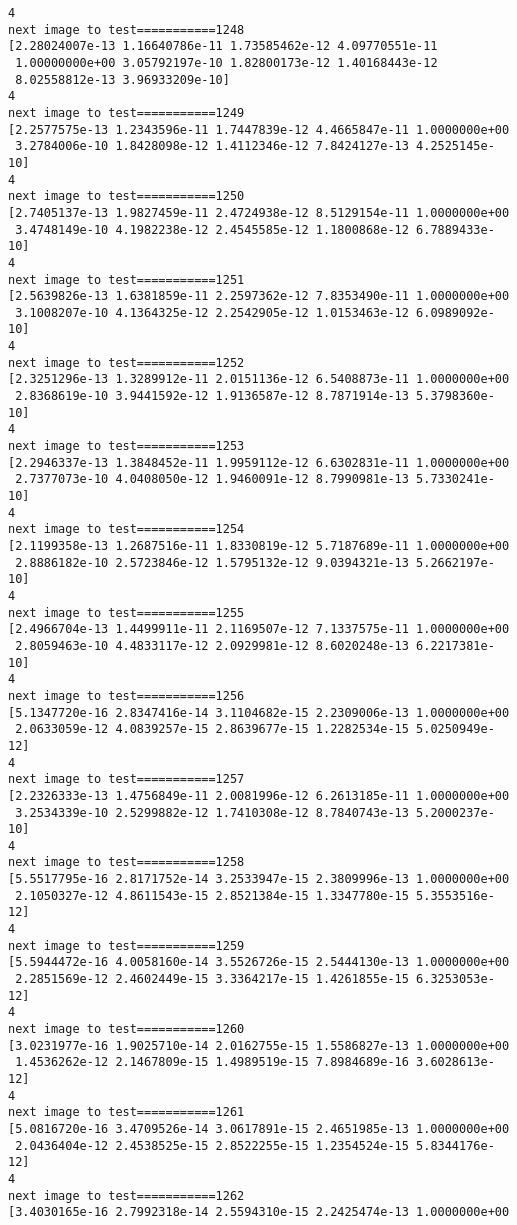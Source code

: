 \documentclass[11pt]{article}
\begin{document}
\begin{Verbatim}[commandchars=\\\{\}]
4
next image to test===========1248
[2.28024007e-13 1.16640786e-11 1.73585462e-12 4.09770551e-11
 1.00000000e+00 3.05792197e-10 1.82800173e-12 1.40168443e-12
 8.02558812e-13 3.96933209e-10]
4
next image to test===========1249
[2.2577575e-13 1.2343596e-11 1.7447839e-12 4.4665847e-11 1.0000000e+00
 3.2784006e-10 1.8428098e-12 1.4112346e-12 7.8424127e-13 4.2525145e-10]
4
next image to test===========1250
[2.7405137e-13 1.9827459e-11 2.4724938e-12 8.5129154e-11 1.0000000e+00
 3.4748149e-10 4.1982238e-12 2.4545585e-12 1.1800868e-12 6.7889433e-10]
4
next image to test===========1251
[2.5639826e-13 1.6381859e-11 2.2597362e-12 7.8353490e-11 1.0000000e+00
 3.1008207e-10 4.1364325e-12 2.2542905e-12 1.0153463e-12 6.0989092e-10]
4
next image to test===========1252
[2.3251296e-13 1.3289912e-11 2.0151136e-12 6.5408873e-11 1.0000000e+00
 2.8368619e-10 3.9441592e-12 1.9136587e-12 8.7871914e-13 5.3798360e-10]
4
next image to test===========1253
[2.2946337e-13 1.3848452e-11 1.9959112e-12 6.6302831e-11 1.0000000e+00
 2.7377073e-10 4.0408050e-12 1.9460091e-12 8.7990981e-13 5.7330241e-10]
4
next image to test===========1254
[2.1199358e-13 1.2687516e-11 1.8330819e-12 5.7187689e-11 1.0000000e+00
 2.8886182e-10 2.5723846e-12 1.5795132e-12 9.0394321e-13 5.2662197e-10]
4
next image to test===========1255
[2.4966704e-13 1.4499911e-11 2.1169507e-12 7.1337575e-11 1.0000000e+00
 2.8059463e-10 4.4833117e-12 2.0929981e-12 8.6020248e-13 6.2217381e-10]
4
next image to test===========1256
[5.1347720e-16 2.8347416e-14 3.1104682e-15 2.2309006e-13 1.0000000e+00
 2.0633059e-12 4.0839257e-15 2.8639677e-15 1.2282534e-15 5.0250949e-12]
4
next image to test===========1257
[2.2326333e-13 1.4756849e-11 2.0081996e-12 6.2613185e-11 1.0000000e+00
 3.2534339e-10 2.5299882e-12 1.7410308e-12 8.7840743e-13 5.2000237e-10]
4
next image to test===========1258
[5.5517795e-16 2.8171752e-14 3.2533947e-15 2.3809996e-13 1.0000000e+00
 2.1050327e-12 4.8611543e-15 2.8521384e-15 1.3347780e-15 5.3553516e-12]
4
next image to test===========1259
[5.5944472e-16 4.0058160e-14 3.5526726e-15 2.5444130e-13 1.0000000e+00
 2.2851569e-12 2.4602449e-15 3.3364217e-15 1.4261855e-15 6.3253053e-12]
4
next image to test===========1260
[3.0231977e-16 1.9025710e-14 2.0162755e-15 1.5586827e-13 1.0000000e+00
 1.4536262e-12 2.1467809e-15 1.4989519e-15 7.8984689e-16 3.6028613e-12]
4
next image to test===========1261
[5.0816720e-16 3.4709526e-14 3.0617891e-15 2.4651985e-13 1.0000000e+00
 2.0436404e-12 2.4538525e-15 2.8522255e-15 1.2354524e-15 5.8344176e-12]
4
next image to test===========1262
[3.4030165e-16 2.7992318e-14 2.5594310e-15 2.2425474e-13 1.0000000e+00

\end{Verbatim}
\end{document}
